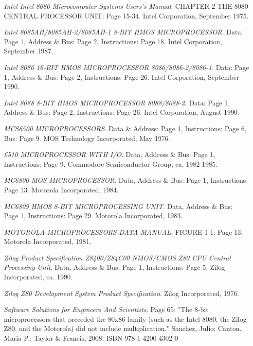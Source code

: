\documentclass[twoside,twocolumn]{article}
\begin{document}
\begin{thebibliography}{99}
\textit{Intel Intel 8080 Microcomputer Systems Users's Manual}.
CHAPTER 2 THE 8080 CENTRAL PROCESSOR UNIT: Page 15-34.
Intel Corporation, September 1975.

\textit{Intel 8085AH/8085AH-2/8085AH-1 8-BIT HMOS MICROPROCESSOR}.
Data: Page 1, Address \& Bus: Page 2, Instructions: Page 18.
Intel Corporation, September 1987.

\textit{Intel 8086 16-BIT HMOS MICROPROCESSOR 8086/8086-2/8086-1}.
Data: Page 1, Address \& Bus: Page 2, Instructions: Page 26.
Intel Corporation, September 1990.

\textit{Intel 8088 8-BIT HMOS MICROPROCESSOR 8088/8088-2}.
Data: Page 1, Address \& Bus: Page 2, Instructions: Page 26.
Intel Corporation, August 1990.

\textit{MCS6500 MICROPROCESSORS}.
Data \& Address: Page 1, Instructions: Page 6, Bus: Page 9.
MOS Technology Incorporated, May 1976.

\textit{6510 MICROPROCESSOR WITH I/O}.
Data, Address \& Bus: Page 1, Instructions: Page 9.
Commodore Semiconductor Group, ca. 1982-1985.

\textit{MC6800 MOS MICROPROCESSOR}.
Data, Address \& Bus: Page 1, Instructions: Page 13.
Motorola Incorporated, 1984.

\textit{MC6809 HMOS 8-BIT MICROPROCESSING UNIT}.
Data, Address \& Bus: Page 1, Instructions: Page 29.
Motorola Incorporated, 1983.

\textit{MOTOROLA MICROPROCESSORS DATA MANUAL}.
FIGURE 1-1: Page 13.
Motorola Incorporated, 1981.

\textit{Zilog Product Specification Z8400/Z84C00 NMOS/CMOS Z80\textsuperscript{\textregistered} CPU Central Processing Unit}.
Data, Address \& Bus: Page 1, Instructions: Page 5.
Zilog Incorporated, ca. 1990.

\textit{Zilog Z80 Development System Product Specification}.
Zilog Incorporated, 1976.

\textit{Software Solutions for Engineers And Scientists}.
Page 65: "The 8-bit microprocessors that preceded the 80x86 family (such as the Intel 8080, the Zilog Z80, and the Motorola) did not include multiplication."
Sanchez, Julio; Canton, Maria P.; Taylor \& Francis, 2008.
ISBN 978-1-4200-4302-0


\end{thebibliography}

\end{document}
